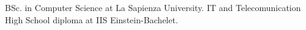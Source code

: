 

\begin{scholarship}
					{BSc. in Computer Science at La Sapienza University.}
					{IT and Telecomunication High School diploma at IIS Einstein-Bachelet.}
\end{scholarship}
